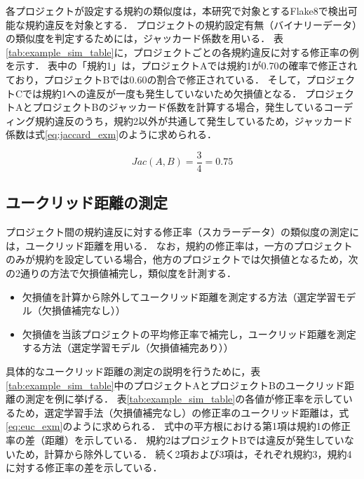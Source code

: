 \documentclass[11pt]{jreport}
\begin{document}
各プロジェクトが設定する規約の類似度は，本研究で対象とするFlake8で検出可能な規約違反を対象とする．
プロジェクトの規約設定有無（バイナリーデータ）の類似度を判定するためには，ジャッカード係数を用いる．
表\ref{tab:example_sim_table}に，プロジェクトごとの各規約違反に対する修正率の例を示す．
表中の「規約1」は，プロジェクトAでは規約1が0.70の確率で修正されており，プロジェクトBでは0.60の割合で修正されている．
そして，プロジェクトCでは規約1への違反が一度も発生していないため欠損値となる．
プロジェクトAとプロジェクトBのジャッカード係数を計算する場合，発生しているコーディング規約違反のうち，規約2以外が共通して発生しているため，ジャッカード係数は式\ref{eq:jaccard_exm}のように求められる．

\begin{equation}
\label{eq:jaccard_exm}
Jac(A, B) = \frac{3}{4} = 0.75
\end{equation}

\subsection{ユークリッド距離の測定}

プロジェクト間の規約違反に対する修正率（スカラーデータ）の類似度の測定には，ユークリッド距離を用いる．
なお，規約の修正率は，一方のプロジェクトのみが規約を設定している場合，他方のプロジェクトでは欠損値となるため，次の2通りの方法で欠損値補完し，類似度を計測する．

\begin{itemize}
    \item 欠損値を計算から除外してユークリッド距離を測定する方法（選定学習モデル（欠損値補完なし））
    \item 欠損値を当該プロジェクトの平均修正率で補完し，ユークリッド距離を測定する方法（選定学習モデル（欠損値補完あり））
\end{itemize}

具体的なユークリッド距離の測定の説明を行うために，表\ref{tab:example_sim_table}中のプロジェクトAとプロジェクトBのユークリッド距離の測定を例に挙げる．
表\ref{tab:example_sim_table}の各値が修正率を示しているため，選定学習手法（欠損値補完なし）の修正率のユークリッド距離は，式\ref{eq:euc_exm}のように求められる．
式中の平方根における第1項は規約1の修正率の差（距離）を示している．
規約2はプロジェクトBでは違反が発生していないため，計算から除外している．
続く2項および3項は，それぞれ規約3，規約4に対する修正率の差を示している．
\end{document}
